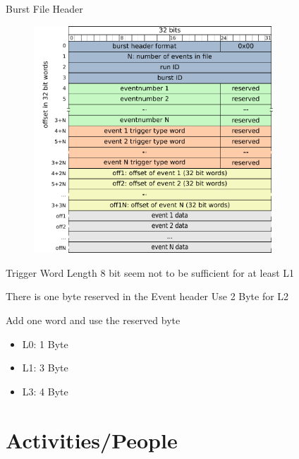 \begin{frame}{Burst File Header}{}
		\begin{figure}[htbp]
		  \centering
		  \includegraphics[width=0.8\textwidth]{BurstFileHeader.pdf}
		\end{figure}
\end{frame}

\begin{frame}{Trigger Word Length}{}
	8 bit seem not to be sufficient for at least L1
	
	\begin{block}{There is one byte reserved in the Event header}
		Use 2 Byte for L2
	\end{block}
	
	\begin{block}{Add one word and use the reserved byte}
		\begin{itemize}
		  \item L0: 1 Byte
		  \item L1: 3 Byte
		  \item L3: 4 Byte
		\end{itemize}
	\end{block}
\end{frame}

\section*{Activities/People}

